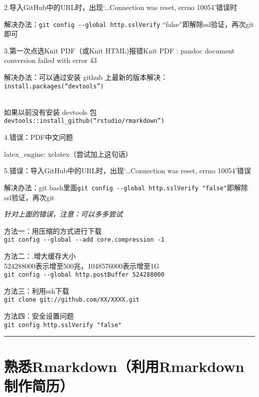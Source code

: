 \documentclass[
]{book}
\begin{document}
2.导入GitHub中的URL时，出现`\ldots Connection was reset, errno 10054'错误时

解决办法：\texttt{git\ config\ -\/-global\ http.sslVerify} ``false''即解除ssl验证，再次git即可

3.第一次点选Knit PDF（或Knit HTML)报错Knit PDF : pandoc document conversion failed with error 43

解决办法：可以通过安装 github 上最新的版本解决：\\
\texttt{install.packages(“devtools”)}\strut \\
如果以前没有安装 devtools 包\\
\texttt{devtools::install\_github(“rstudio/rmarkdown”)}

4.错误：PDF中文问题

latex\_engine: xelatex（尝试加上这句话）

5.错误：导入GitHub中的URL时，出现`\ldots Connection was reset, errno 10054'错误

解决办法：git bash里面\texttt{git\ config\ -\/-global\ http.sslVerify\ "false"}即解除ssl验证，再次git

\emph{针对上面的错误，注意：可以多多尝试}

方法一：用压缩的方式进行下载\\
\texttt{git\ config\ -\/-global\ -\/-add\ core.compression\ -1}

方法二：.增大缓存大小\\
524288000表示增至500兆，1048576000表示增至1G\\
\texttt{git\ config\ -\/-global\ http.postBuffer\ 524288000}

方法三：利用ssh下载\\
\texttt{git\ clone\ git://github.com/XX/XXXX.git}

方法四：安全设置问题\\
\texttt{git\ config\ http.sslVerify\ "false"}

\begin{center}\rule{0.5\linewidth}{0.5pt}\end{center}

\hypertarget{ux719fux6089rmarkdownux5229ux7528rmarkdownux5236ux4f5cux7b80ux5386}{%
\section{熟悉Rmarkdown（利用Rmarkdown制作简历）}\label{ux719fux6089rmarkdownux5229ux7528rmarkdownux5236ux4f5cux7b80ux5386}}
\end{document}
